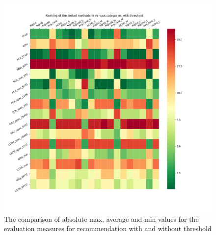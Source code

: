 \begin{figure}[h!]
    \centering
	\includegraphics[width=140mm]{./img/threshold_method_ranking.png}
	\caption{The comparison of absolute max, average and min values for the evaluation measures for recommendation with and without threshold}
	\label{fig:absolute_value_comparison}
\end{figure}


